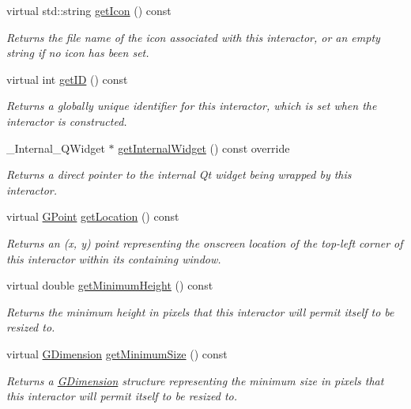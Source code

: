\begin{DoxyCompactItemize}
virtual std\+::string \mbox{\hyperlink{classGInteractor_aaed62a73004939a64da6f0eb9eb64d73}{get\+Icon}} () const
\begin{DoxyCompactList}\small\item\em Returns the file name of the icon associated with this interactor, or an empty string if no icon has been set. \end{DoxyCompactList}\item 
virtual int \mbox{\hyperlink{classGInteractor_a9c9659a6c6ba66b4107ba59c95a24241}{get\+ID}} () const
\begin{DoxyCompactList}\small\item\em Returns a globally unique identifier for this interactor, which is set when the interactor is constructed. \end{DoxyCompactList}\item 
\+\_\+\+Internal\+\_\+\+Q\+Widget $\ast$ \mbox{\hyperlink{classGTable_a2f6b36b2517087dc90a366b5ce1f5323}{get\+Internal\+Widget}} () const override
\begin{DoxyCompactList}\small\item\em Returns a direct pointer to the internal Qt widget being wrapped by this interactor. \end{DoxyCompactList}\item 
virtual \mbox{\hyperlink{structGPoint}{G\+Point}} \mbox{\hyperlink{classGInteractor_a4f83802015511edeb63b892830812c11}{get\+Location}} () const
\begin{DoxyCompactList}\small\item\em Returns an (x, y) point representing the onscreen location of the top-\/left corner of this interactor within its containing window. \end{DoxyCompactList}\item 
virtual double \mbox{\hyperlink{classGInteractor_aed4b0075fcc434499c3cb3e46896bda3}{get\+Minimum\+Height}} () const
\begin{DoxyCompactList}\small\item\em Returns the minimum height in pixels that this interactor will permit itself to be resized to. \end{DoxyCompactList}\item 
virtual \mbox{\hyperlink{structGDimension}{G\+Dimension}} \mbox{\hyperlink{classGInteractor_a66b5af0b32493b4d597ca0a3df2049ea}{get\+Minimum\+Size}} () const
\begin{DoxyCompactList}\small\item\em Returns a \mbox{\hyperlink{structGDimension}{G\+Dimension}} structure representing the minimum size in pixels that this interactor will permit itself to be resized to. \end{DoxyCompactList}\item 

\end{DoxyCompactItemize}
